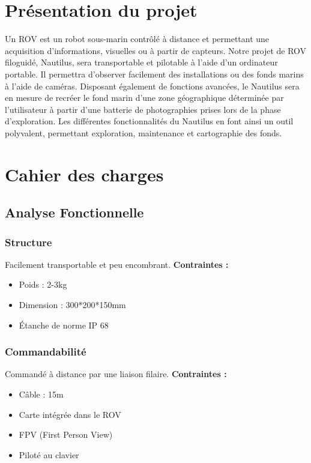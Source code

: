 \documentclass[a4paper,11pt]{report}
\begin{document}
\chapter{Présentation du projet}
        
				Un ROV est un robot sous-marin contrôlé à distance et permettant une acquisition d'informations, visuelles ou à partir de capteurs. Notre projet de ROV filoguidé, Nautilus, sera transportable et pilotable à l'aide d'un ordinateur portable. Il permettra d'observer facilement des installations ou des fonds marins à l'aide de caméras. Disposant également de fonctions avancées, le Nautilus sera en mesure de recréer le fond marin d'une zone géographique déterminée par l'utilisateur à partir d'une batterie de photographies prises lors de la phase d'exploration. Les différentes fonctionnalités du Nautilus en font ainsi un outil polyvalent, permettant exploration, maintenance et cartographie des fonds.
				
				
\chapter{Cahier des charges}

        \section{Analyse Fonctionnelle}
						\subsection{Structure}
								Facilement transportable et peu encombrant.\newline
								\textbf{Contraintes :}
								\begin{itemize}
										\item Poids : 2-3kg
										\item Dimension : 300*200*150mm
										\item Étanche de norme IP 68 \newline \newline
									\end{itemize}

						\subsection{Commandabilité}
								Commandé à distance par une liaison filaire.\newline
								\textbf{Contraintes :}
								\begin{itemize}
										\item Câble : 15m
										\item Carte intégrée dans le ROV
										\item FPV (First Person View)
										\item Piloté au clavier\newline \newline
								\end{itemize}
\end{document}
